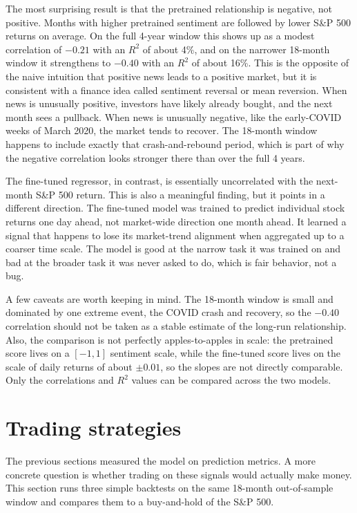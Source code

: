 \documentclass[11pt]{article}
\begin{document}
The most surprising result is that the pretrained relationship is negative, not positive. Months with higher pretrained sentiment are followed by lower S\&P 500 returns on average. On the full 4-year window this shows up as a modest correlation of $-0.21$ with an $R^2$ of about 4\%, and on the narrower 18-month window it strengthens to $-0.40$ with an $R^2$ of about 16\%. This is the opposite of the naive intuition that positive news leads to a positive market, but it is consistent with a finance idea called sentiment reversal or mean reversion. When news is unusually positive, investors have likely already bought, and the next month sees a pullback. When news is unusually negative, like the early-COVID weeks of March 2020, the market tends to recover. The 18-month window happens to include exactly that crash-and-rebound period, which is part of why the negative correlation looks stronger there than over the full 4 years.

The fine-tuned regressor, in contrast, is essentially uncorrelated with the next-month S\&P 500 return. This is also a meaningful finding, but it points in a different direction. The fine-tuned model was trained to predict individual stock returns one day ahead, not market-wide direction one month ahead. It learned a signal that happens to lose its market-trend alignment when aggregated up to a coarser time scale. The model is good at the narrow task it was trained on and bad at the broader task it was never asked to do, which is fair behavior, not a bug.

A few caveats are worth keeping in mind. The 18-month window is small and dominated by one extreme event, the COVID crash and recovery, so the $-0.40$ correlation should not be taken as a stable estimate of the long-run relationship. Also, the comparison is not perfectly apples-to-apples in scale: the pretrained score lives on a $[-1, 1]$ sentiment scale, while the fine-tuned score lives on the scale of daily returns of about $\pm 0.01$, so the slopes are not directly comparable. Only the correlations and $R^2$ values can be compared across the two models.

\section{Trading strategies}

The previous sections measured the model on prediction metrics. A more concrete question is whether trading on these signals would actually make money. This section runs three simple backtests on the same 18-month out-of-sample window and compares them to a buy-and-hold of the S\&P 500.
\end{document}
